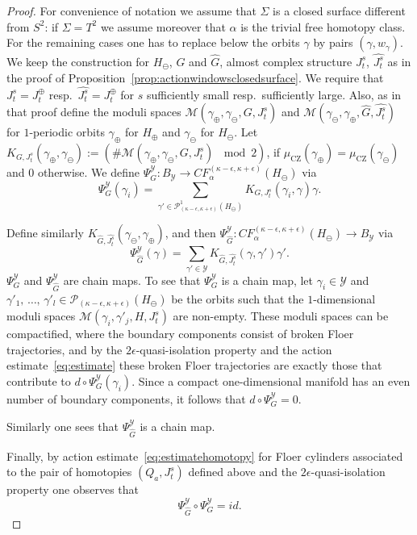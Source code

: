 \documentclass[AHL,Unicode,longabstracts,published]{cedram}
\newcommand{\id}{id}
\newcommand{\rCZ}{\mathrm{CZ}}
\newcommand{\clP}{\mathcal{P}}
\newcommand{\clY}{\mathcal{Y}}
\newcommand{\clM}{\mathcal{M}}
\begin{document}
\begin{proof}
For convenience of notation we assume that $\Sigma$ is a closed surface different from $S^2$: if $\Sigma = T^2$ we assume moreover that $\alpha$ is the trivial free homotopy class. For the remaining cases one has to replace below the orbits $\gamma$ by pairs $(\gamma,w_\gamma)$. We keep the construction for $H_{\ominus}$, $G$ and $\widehat{G}$, almost complex structure $J^s_t$, $\widehat{J^s_t}$ as in the proof of Proposition~\ref{prop:actionwindowsclosedsurface}. We require that $J_t^s = J_t^{\oplus}$ resp.\ $\widehat{J^s_t} = J_t^{\oplus}$ for $s$ sufficiently small resp.\ sufficiently large. Also, as in that proof define the moduli spaces $\clM(\gamma_{\oplus}, \gamma_{\ominus}, G,J^s_t)$ and $\clM(\gamma_{\ominus}, \gamma_{\oplus}, \widehat{G},\widehat{J^s_t})$ for $1$-periodic orbits $\gamma_{\oplus}$ for $H_{\oplus}$ and $\gamma_{\ominus}$ for $H_{\ominus}$. Let $K_{G,J^s_t}(\gamma_{\oplus},\gamma_{\ominus}) := (\# \clM(\gamma_{\oplus}, \gamma_{\ominus}, G,J^s_t) \, \mod 2)$, if $\mu_{\rCZ}(\gamma_{\oplus}) = \mu_{\rCZ}(\gamma_{\ominus})$ and $0$ otherwise. We define $\Psi^{\clY}_G: {B}_{\clY} \to CF_\alpha^{(\kappa-{\epsilon},\kappa+{\epsilon})}(H_\ominus) $ via
\begin{equation*}
\Psi^{\clY}_G(\gamma_i) = \sum_{\gamma' \in \clP^1_{(\kappa-\epsilon,\kappa+\epsilon)}(H_{\ominus})} K_{G,J^s_t}(\gamma_i,\gamma) \gamma.
\end{equation*}


Define similarly $K_{\widehat{G},\widehat{J^s_t}}(\gamma_{\ominus},\gamma_{\oplus})$, and then $\Psi^{\clY}_{\widehat{G}}: CF_\alpha^{(\kappa-{\epsilon},\kappa+{\epsilon})}(H_\ominus) \to {B}_{\clY}$ via
\begin{equation*}
\Psi^{\clY}_{\widehat{G}}(\gamma) = \sum_{\gamma' \in \clY} K_{\widehat{G},\widehat{J^s_t}}(\gamma,\gamma')\gamma'.
\end{equation*}
$\Psi^{\clY}_G$ and $\Psi^{\clY}_{\widehat{G}}$ are chain maps. To see that $\Psi^{\clY}_G$ is a chain map, let $\gamma_i \in \clY$ and $\gamma'_1,\,\ldots,\, \gamma'_l \in \clP_{(\kappa-\epsilon,\kappa+\epsilon)}(H_{\ominus})$ be the orbits such that the $1$-dimensional moduli spaces $\clM(\gamma_i, \gamma'_j, H, J^s_t)$ are non-empty. These moduli spaces can be compactified, where the boundary components consist of broken Floer trajectories, and by the $2\epsilon$-quasi-isolation property and the action estimate~\eqref{eq:estimate} these broken Floer trajectories are exactly those that contribute to $d \circ \Psi^{\clY}_G(\gamma_i)$. Since a compact one-dimensional manifold has an even number of boundary components, it follows that $d \circ \Psi^{\clY}_G = 0$.

Similarly one sees that $\Psi^{\clY}_{\widehat{G}}$ is a chain map.

Finally, by action estimate~\eqref{eq:estimatehomotopy} for Floer cylinders associated to the pair of homotopies $(Q_a, J^s_t)$ defined above and the $2\epsilon$-quasi-isolation property one observes that
\[
\Psi^{\clY}_{\widehat{G}}\circ {\Psi^{\clY}_G} = \id.
\]
\end{proof}
\end{document}

